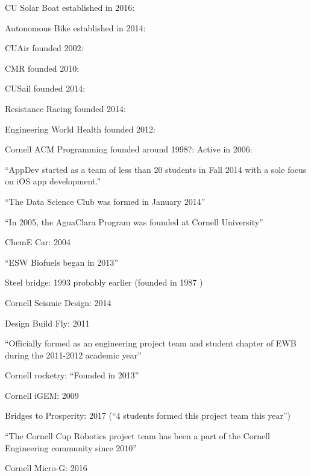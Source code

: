 \documentclass[12pt]{article}
\begin{document}
CU Solar Boat established in 2016:
\cite{noauthor_cu_2017}

Autonomous Bike established in 2014:
\cite{murphy_cu_2017}

CUAir founded 2002:
\cite{noauthor_cuair_2017}

CMR founded 2010:
\cite{noauthor_cornell_2018}

CUSail founded 2014:
\cite{noauthor_cu_2017-1}

Resistance Racing founded 2014:
\cite{noauthor_about_2015}

Engineering World Health founded 2012:
\cite{noauthor_cornell_2017-1}

Cornell ACM Programming founded around 1998?:
\cite{noauthor_cornell_2016}
Active in 2006:
\cite{noauthor_cornell_2018-1}

``AppDev started as a team of less than 20 students in Fall 2014 with a sole focus on iOS app development.''
\cite{cornell_appdev_introducing_2018}

``The Data Science Club was formed in January 2014''
\cite{noauthor_cornell_2014}

``In 2005, the AguaClara Program was founded at Cornell University''
\cite{noauthor_aguaclara_nodate}

ChemE Car: 2004
\cite{noauthor_cornell_2017-2}

``ESW Biofuels began in 2013''
\cite{noauthor_esw_nodate}

Steel bridge: 1993
\cite{noauthor_cee_2011}
probably earlier (founded in 1987 \cite{robert_e._shaw_jr._bridging_1988})

Cornell Seismic Design: 2014
\cite{noauthor_2014_2014}

Design Build Fly: 2011
\cite{noauthor_design/build/fly_nodate}

``Officially formed as an engineering project team and student chapter of EWB during the 2011-2012 academic year''
\cite{noauthor_our_2016}

Cornell rocketry: ``Founded in 2013''
\cite{noauthor_cornell_2015}

Cornell iGEM: 2009
\cite{noauthor_team:cornell/team_2009}

Bridges to Prosperity: 2017 (``4 students formed this project team this year'')
\cite{noauthor_give_2018}

``The Cornell Cup Robotics project team has been a part of the Cornell Engineering community since 2010''
\cite{noauthor_cornell_2018-2}

Cornell Micro-G: 2016
\cite{ghosh_student_2016}
\end{document}
